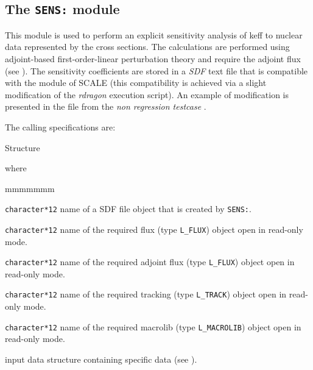 \subsection{The {\tt SENS:} module}\label{sect:SENSData}

This module is used to perform an explicit sensitivity analysis of keff to nuclear data represented by the cross sections.\cite{Laville}
The calculations are performed using adjoint-based first-order-linear perturbation theory and require the adjoint flux (see ).
The sensitivity coefficients are stored in a \textit{SDF} text file that is compatible with the  module of SCALE\cite{SCALE}
(this compatibility is achieved via a slight modification of the \textit{rdragon} execution script).
An example of modification is presented in the file  from the \textit{non regression testcase} .

\vskip 0.02cm

The calling specifications are:

\begin{DataStructure}{Structure }
~\moc{:=}~~~~~~\moc{::}~ \\
\end{DataStructure}

\noindent where
\begin{ListeDeDescription}{mmmmmmm}

\item[\dusa{SENS.sdf}] {\tt character*12} name of a {\sc SDF} file object that is created by {\tt SENS:}.

\item[\dusa{FLUNAM}] {\tt character*12} name of the required {\sc flux} (type {\tt L\_FLUX}) object open in read-only mode.

\item[\dusa{ADJ$\_$FLUNAM}] {\tt character*12} name of the required {\sc adjoint flux} (type {\tt L\_FLUX}) object open in read-only mode.

\item[\dusa{TRKNAM}] {\tt character*12} name of the required {\sc tracking} (type {\tt L\_TRACK}) object open in read-only mode.

\item[\dusa{MACRO}] {\tt character*12} name of the required {\sc macrolib} (type {\tt L\_MACROLIB}) object open in read-only mode.

\item[\dusa{SENS\_data}] input data structure containing specific data (see ).

\end{ListeDeDescription}

